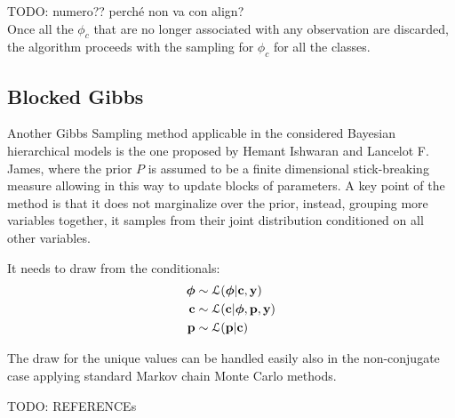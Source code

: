 TODO: numero?? perché non va con align? \\

Once all the $\phi_c$ that are no longer associated with any observation are discarded, the algorithm proceeds with the sampling for $\phi_c$ for all the classes.


\subsection{Blocked Gibbs}
Another Gibbs Sampling method applicable in the considered Bayesian hierarchical models is the one proposed by Hemant Ishwaran and Lancelot F. James, where the prior $P$ is assumed to be a finite dimensional stick-breaking measure allowing in this way to update blocks of parameters. A key point of the method is that it does not marginalize over the prior, instead, grouping more variables together, it samples from their joint distribution conditioned on all other variables. 

It needs to draw from the conditionals:
	\begin{align}
			\boldsymbol\phi &\sim \mathcal L(\boldsymbol\phi | \mathbf{c}, \mathbf{y}) \nonumber \\
			\mathbf{c} &\sim \mathcal L (\mathbf{c}| \boldsymbol\phi,\mathbf{p}, \mathbf{y}) \nonumber \\
			\mathbf{p} &\sim \mathcal L (\mathbf{p}| \mathbf{c}) \nonumber
		\end{align}

The draw for the unique values can be handled easily also in the non-conjugate case applying standard Markov chain Monte Carlo methods.


TODO: REFERENCEs